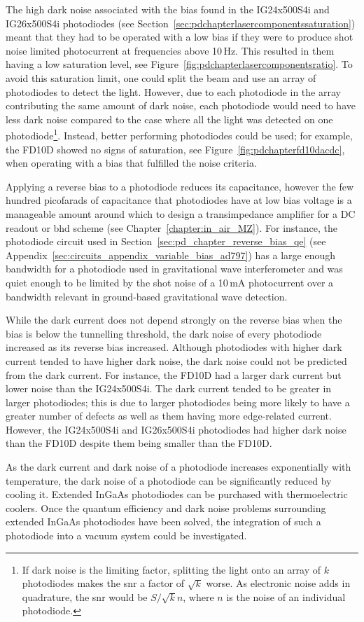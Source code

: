 \par
The high dark noise associated with the bias found in the IG24x500S4i and IG26x500S4i photodiodes (see Section~\ref{sec:pdchapterlasercomponentssaturation}) meant that they had to be operated with a low bias if they were to produce shot noise limited photocurrent at frequencies above 10\,Hz. This resulted in them having a low saturation level, see Figure~\ref{fig:pdchapterlasercomponentsratio}. To avoid this saturation limit, one could split the beam and use an array of photodiodes to detect the light. However, due to each photodiode in the array contributing the same amount of dark noise, each photodiode would need to have less dark noise compared to the case where all the light was detected on one photodiode\footnote{If dark noise is the limiting factor, splitting the light onto an array of $k$ photodiodes makes the \gls{snr} a factor of $\sqrt{k}$ worse. As electronic noise adds in quadrature, the \gls{snr} would be $S/\sqrt{k}n$, where $n$ is the noise of an individual photodiode.}. Instead, better performing photodiodes could be used; for example, the FD10D showed no signs of saturation, see Figure~\ref{fig:pdchapterfd10dacdc}, when operating with a bias that fulfilled the noise criteria. 
\par
Applying a reverse bias to a photodiode reduces its capacitance, however the few hundred picofarads of capacitance that photodiodes have at low bias voltage is a manageable amount around which to design a transimpedance amplifier for a DC readout or \gls{bhd} scheme (see Chapter~\ref{chapter:in_air_MZ}). For instance, the photodiode circuit used in Section~\ref{sec:pd_chapter_reverse_bias_qe} (see Appendix~\ref{sec:circuits_appendix_variable_bias_ad797}) has a large enough bandwidth for a photodiode used in gravitational wave interferometer and was quiet enough to be limited by the shot noise of a 10\,mA photocurrent over a bandwidth relevant in ground-based gravitational wave detection.
\par
While the dark current does not depend strongly on the reverse bias when the bias is below the tunnelling threshold, the dark noise of every photodiode increased as its reverse bias increased. Although photodiodes with higher dark current tended to have higher dark noise, the dark noise could not be predicted from the dark current. For instance, the FD10D had a larger dark current but lower noise than the IG24x500S4i. The dark current tended to be greater in larger photodiodes; this is due to larger photodiodes being more likely to have a greater number of defects as well as them having more edge-related current. However, the IG24x500S4i and IG26x500S4i photodiodes had higher dark noise than the FD10D despite them being smaller than the FD10D.
\par
As the dark current and dark noise of a photodiode increases exponentially with temperature, the dark noise of a photodiode can be significantly reduced by cooling it. Extended InGaAs photodiodes can be purchased with thermoelectric coolers. Once the quantum efficiency and dark noise problems surrounding extended InGaAs photodiodes have been solved, the integration of such a photodiode into a vacuum system could be investigated.
